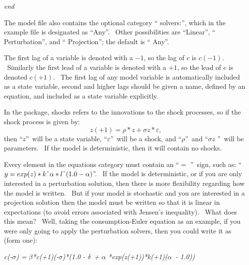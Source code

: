 \documentclass[notitlepage,11pt]{article}
\begin{document}
\textit{end}

\bigskip 

The model file also contains the optional category \textquotedblleft
solvers:\textquotedblright , which in the example file is designated as
\textquotedblleft Any\textquotedblright . \ Other possibilities are
\textquotedblleft Linear\textquotedblright , \textquotedblleft
Perturbation\textquotedblright , and \textquotedblleft
Projection\textquotedblright ; the default is \textquotedblleft
Any\textquotedblright .

The first lag of a variable is denoted with a $-1$, so the lag of $c$ is $%
c(-1)$. \ Similarly the first lead of a variable is denoted with a $+1$, so
the lead of $c$ is denoted $c(+1)$. \ The first lag of any model variable is
automatically included as a state variable, second and higher lags should be
given a name, defined by an equation, and included as a state variable
explicitly.

In the package, shocks refers to the innovations to the shock processes, so
if the shock process is given by:%
\begin{equation*}
z(+1)=\rho \ast z+\sigma z\ast \varepsilon ,
\end{equation*}%
then \textquotedblleft $z$\textquotedblright\ will be a state variable,
\textquotedblleft $\varepsilon $\textquotedblright\ will be a shock, and
\textquotedblleft $\rho $\textquotedblright\ and \textquotedblleft $\sigma z$%
\textquotedblright\ will be parameters. \ If the model is deterministic,
then it will contain no shocks.

Every element in the equations category must contain an \textquotedblleft $=$%
\textquotedblright\ sign, such as: \textquotedblleft $y=exp(z)\ast k\symbol{%
94}\alpha \ast l\symbol{94}(1.0-\alpha )$\textquotedblright . \ If the model
is deterministic, or if you are only interested in a perturbation solution,
then there is more flexibility regarding how the model is written. \ But if
your model is stochastic and you are interested in a projection solution
then the model must be written so that it is linear in expectations (to
avoid errors associated with Jensen's inequality). \ What does this mean? \
Well, taking the consumption-Euler equation as an example, if you were only
going to apply the perturbation solvers, then you could write it as (form
one):

\bigskip

\textit{c(-}$\sigma $\textit{) = }$\beta $\textit{*c(+1)\symbol{94%
}(-}$\sigma $\textit{)*(1.0 - }$\delta $\textit{\ + }$\alpha $\textit{%
*exp(z(+1))*k(+1)\symbol{94}(}$\alpha $\textit{\ - 1.0))}
\end{document}
